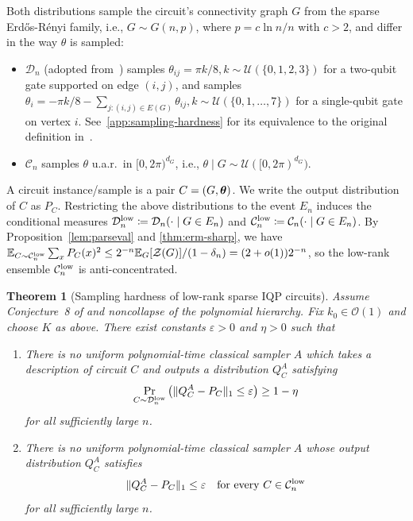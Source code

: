 \documentclass{article}
\theoremstyle{plain}
\newtheorem{theorem}{Theorem}[section]
\theoremstyle{definition}
\theoremstyle{remark}
\begin{document}
Both distributions sample the circuit's connectivity graph $G$ from the sparse Erd\H os-R\'enyi family, i.e., $G\sim G(n,p)$, where $p=c\ln n/n$ with $c>2$, and differ in the way $\theta$ is sampled: 
\begin{itemize}
    \item $\mathcal{D}_n$ (adopted from~\cite{Bremner17}) samples $\theta_{ij}=\pi k / 8, k\sim\mathcal{U}(\{0, 1,2,3\})$ for a two-qubit gate supported on edge $(i,j)$, and samples $\theta_{i}=-\pi k / 8 - \sum_{j\colon (i,j)\in E(G)} \theta_{ij}, k\sim\mathcal{U}(\{0, 1,\ldots,7\})$ for a single-qubit gate on vertex $i$. See~\cref{app:sampling-hardness} for its equivalence to the original definition in~\cite{Bremner17}.
    \item $\mathcal{C}_n$ samples $\theta$ u.a.r.~in $[0,2\pi)^{d_G}$, i.e., $\theta \mid G\sim \mathcal{U}([0,2\pi)^{d_G})$.
\end{itemize}
A circuit instance/sample is a pair $C=(G,{\bm{\theta}})$. We write the output distribution of $C$ as $P_C$. Restricting the above distributions to the event $E_n$ induces the
conditional measures $\mathcal{D}_n^{\rm low} \coloneqq \mathcal{D}_n(\cdot\mid G\in E_n)$ and $\mathcal{C}_n^{\rm low} \coloneqq \mathcal{C}_n(\cdot\mid G\in E_n)$. By Proposition~\ref{lem:parseval} and \cref{thm:erm-sharp}, we have $\mathbb{E}_{C\sim\mathcal{C}_n^{\rm low}}\sum_x P_C(x)^2 \leq 2^{-n}\mathbb{E}_G[\mathcal Z(G)]/(1-\delta_n) =(2+o(1))2^{-n}$, so the low-rank ensemble $\mathcal{C}_n^{\rm low}$ is anti-concentrated.

\begin{theorem}[Sampling hardness of low-rank sparse IQP circuits]
\label{thm:sampling-hardness}
Assume Conjecture~8 of \cite{Bremner17} and noncollapse of the polynomial
hierarchy. Fix $k_0\in\mathcal{O}(1)$ and choose $K$ as above. There exist constants $\varepsilon>0$ and $\eta>0$ such that
\begin{enumerate}
    \item There is no uniform polynomial-time classical sampler $A$ which takes a description of circuit $C$ and outputs a distribution $Q_C^A$ satisfying
    \begin{equation} \label{eq:low-rank-average-hardness}
    \Pr_{C\sim\mathcal D_n^{\rm low}}\left(\|Q_C^A-P_C\|_1\leq\varepsilon \right) \geq 1 - \eta
    \end{equation}
    for all sufficiently large $n$.
    \item There is no uniform polynomial-time classical sampler $A$ whose output distribution $Q_C^A$ satisfies
    \begin{equation}
    \|Q_C^A-P_C\|_1\leq\varepsilon \quad\text{for every } C\in\mathcal{C}_n^{\rm low}
    \label{eq:low-rank-sampling-error}
    \end{equation}
    for all sufficiently large $n$.
\end{enumerate}
\end{theorem}
\end{document}
